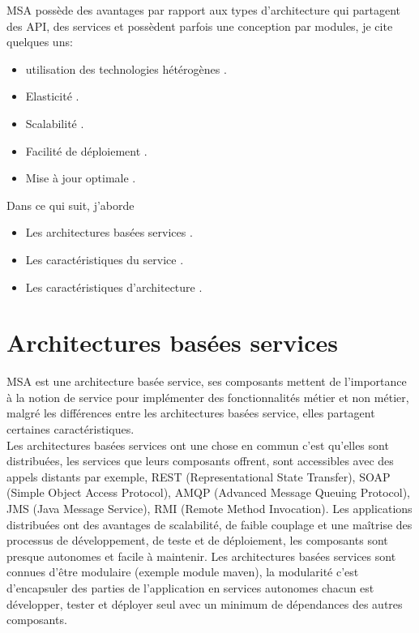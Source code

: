 \documentclass[12pt, a4paper, openany]{report}
\begin{document}
    MSA possède des avantages par rapport aux types d'architecture qui partagent des API, des services et possèdent parfois une conception par modules, je cite quelques uns:  
                                                \begin{itemize}
                                                 \item utilisation des technologies hétérogènes .
                                                 \item Elasticité .
                                                 \item Scalabilité .
                                                 \item Facilité de déploiement .
                                                 \item Mise à jour optimale .
                                                \end{itemize}
   
   Dans ce qui suit, j'aborde  
                                                \begin{itemize}
                                                 \item Les architectures basées services .
                                                 \item Les caractéristiques du service .
                                                 \item Les caractéristiques d'architecture .
                                                \end{itemize}
                                                      
 \section{Architectures basées services}
  MSA est une architecture basée service, ses composants mettent de l’importance à la notion de service pour implémenter des fonctionnalités métier et non métier, malgré les différences entre les architectures basées service, elles partagent certaines caractéristiques.\\
 
 Les architectures basées services ont une chose en commun c’est qu’elles sont distribuées, les services que leurs composants offrent, sont accessibles avec des appels distants par exemple, REST (Representational State Transfer), SOAP (Simple Object Access Protocol), AMQP (Advanced Message Queuing Protocol), JMS (Java Message Service), RMI (Remote Method Invocation). Les applications distribuées ont des avantages de scalabilité, de faible couplage et une maîtrise des processus de développement, de teste et de déploiement, les composants sont presque autonomes et facile à maintenir. Les architectures basées services sont connues d’être modulaire (exemple module maven), la modularité c’est d’encapsuler des parties de l’application en services autonomes chacun est développer, tester et déployer seul avec un minimum de dépendances des autres composants.\\
 
\end{document}
